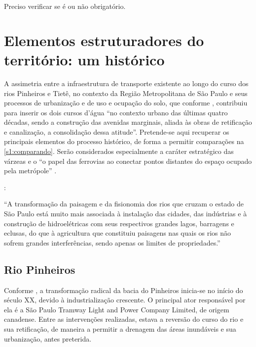 \documentclass[
article,			%
11pt,				%
oneside,			%
a4paper,			%
english,			%
brazil,				%
sumario=tradicional
]{abntex2}
\begin{document}
	Preciso verificar se é ou não obrigatório.
	
	\lipsum[3]
	
	\section{Elementos estruturadores do território: um histórico} \label{s1:elementos}
	
	A assimetria entre a infraestrutura de transporte existente ao longo do curso dos rios Pinheiros e Tietê, no contexto da Região Metropolitana de São Paulo e seus processos de urbanização e de uso e ocupação do solo, que conforme , contribuiu para inserir os dois cursos d'água ``no contexto urbano das últimas quatro décadas, sendo a construção das avenidas marginais, aliada às obras de retificação e canalização, a consolidação dessa atitude''. Pretende-se aqui recuperar os principais elementos do processo histórico, de forma a permitir comparações na \autoref{s1:comparando}. Serão considerados especialmente a caráter estratégico das várzeas \cite[p.63]{franco2005a} e o ``o papel das ferrovias ao conectar pontos distantes do espaço ocupado pela metrópole'' \cite[p.63]{franco2005a}.
	
	:
	
	\begin{citacao}
		``A transformação da paisagem e da fisionomia dos rios que cruzam o estado de São Paulo está muito mais associada à instalação das cidades, das indústrias e à construção de hidroelétricas com seus respectivos grandes lagos, barragens e eclusas, do que à agricultura que constituiu paisagens nas quais os rios não sofrem grandes interferências, sendo apenas os limites de propriedades.''
	\end{citacao}
	
	\subsection{Rio Pinheiros} \label{s2:riopinheiros}
	
	Conforme , a transformação radical da bacia do Pinheiros inicia-se no início do século XX, devido à industrialização crescente. O principal ator responsável por ela é a São Paulo Tramway Light and Power Company Limited, de origem canadense. Entre as intervenções realizadas, estava a reversão do curso do rio e sua retificação, de maneira a permitir a drenagem das áreas inundáveis e sua urbanização, antes preterida.
	
\end{document}
